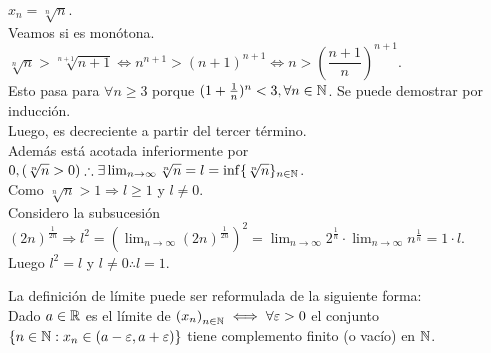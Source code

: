 \begin{eg}
  \(x_n = \sqrt[n]{n} \). \\
  Veamos si es monótona. \(\sqrt[n]{n} > \sqrt[n+1]{n+1} \iff n^{n+1} > (n+1)^{n+1} \iff n > (\dfrac{n+1}{n})^{n+1} \). \\
  Esto pasa para \(\forall n \geq 3\) porque \((1+\frac{1}{n})^n < 3, \forall n \in \mathbb{N} \). Se puede demostrar por inducción. \\
  Luego, es decreciente a partir del tercer término. \\
  Además está acotada inferiormente por \(0, (\sqrt[n]{n} > 0) \therefore \exists \lim_{n \to \infty} \sqrt[n]{n} = l = \inf\{ \sqrt[n]{n} \}_{n \in \mathbb{N}} \). \\
  Como \(\sqrt[n]{n} > 1 \Rightarrow l \geq 1\) y \(l \neq 0\). \\
  Considero la subsucesión \((2n)^{\frac{1}{2n}} \Rightarrow l^2 = (\lim_{n \to \infty} (2n)^{\frac{1}{2n}})^2 = \lim_{n \to \infty} 2^{\frac{1}{n}} \cdot \lim_{n \to \infty} n^{\frac{1}{n}} = 1 \cdot l\). \\
  Luego \(l^2 = l\) y \(l \neq 0 \therefore l = 1\).
\end{eg}

\begin{note}
  La definición de límite puede ser reformulada de la siguiente forma: \\
  Dado \(a \in \mathbb{R} \) es el límite de \({(x_n)}_{n \in \mathbb{N}} \iff \forall \varepsilon > 0\) el conjunto \(\{ n \in \mathbb{N} : x_n \in (a - \varepsilon, a + \varepsilon) \} \) tiene complemento finito (o vacío) en \(\mathbb{N} \).
\end{note}

